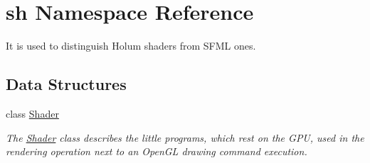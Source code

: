 \hypertarget{namespacesh}{}\section{sh Namespace Reference}
\label{namespacesh}


It is used to distinguish Holum shaders from S\+F\+ML ones.  


\subsection*{Data Structures}
\begin{DoxyCompactItemize}
\item 
class \hyperlink{classsh_1_1Shader}{Shader}
\begin{DoxyCompactList}\small\item\em The \hyperlink{classsh_1_1Shader}{Shader} class describes the little programs, which rest on the G\+PU, used in the rendering operation next to an Open\+GL drawing command execution. \end{DoxyCompactList}\end{DoxyCompactItemize}
